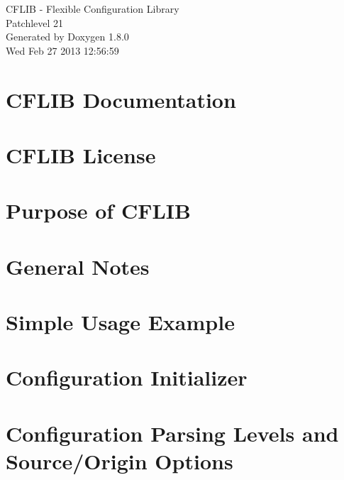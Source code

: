 \documentclass{article}
\begin{document}
\hypersetup{pageanchor=false,citecolor=blue}
\begin{titlepage}
\vspace*{7cm}
\begin{center}
{\Large C\-F\-L\-I\-B -\/ Flexible Configuration Library \\[1ex]\large Patchlevel 21 }\\
\vspace*{1cm}
{\large Generated by Doxygen 1.8.0}\\
\vspace*{0.5cm}
{\small Wed Feb 27 2013 12:56:59}\\
\end{center}
\end{titlepage}
\tableofcontents
{}
\hypersetup{pageanchor=true,citecolor=blue}
\section{C\-F\-L\-I\-B Documentation}
\label{index}\hypertarget{index}{}
\section{C\-F\-L\-I\-B License}
\label{license}
\hypertarget{license}{}

\section{Purpose of C\-F\-L\-I\-B}
\label{purpose}
\hypertarget{purpose}{}

\section{General Notes}
\label{properties}
\hypertarget{properties}{}

\section{Simple Usage Example}
\label{simple_example}
\hypertarget{simple_example}{}

\section{Configuration Initializer}
\label{config_initializer}
\hypertarget{config_initializer}{}

\section{Configuration Parsing Levels and Source/\-Origin Options}
\label{config_levels}
\hypertarget{config_levels}{}

\end{document}
